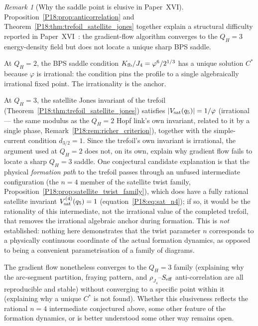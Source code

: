 \documentclass[11pt,a4paper]{article}
\theoremstyle{definition}\newtheorem{definition}[theorem]{Definition}
\theoremstyle{remark}
\newtheorem{remark}[theorem]{Remark}
\newcommand{\vp}{\varphi}
\newcommand{\QH}{Q_H}
\newcommand{\dimq}[1]{d_{#1}}
\newcommand{\Jones}{V}
\begin{document}
\begin{remark}[Why the saddle point is elusive in Paper~XVI]
\label{P18:rem:saddle_difficulty}
Proposition~\ref{P18:prop:anticorrelation} and
Theorem~\ref{P18:thm:trefoil_satellite_jones} together explain a structural
difficulty reported in Paper~XVI~\cite{Paper16}: the gradient-flow
algorithm converges to the $\QH=3$ energy-density field but does
not locate a unique sharp BPS saddle.

At $\QH=2$, the BPS saddle condition $K_{\rm fb}/J_4=\vp^6/2^{1/3}$
has a unique solution $C^*$ because $\vp$ is irrational: the
condition pins the profile to a single algebraically irrational
fixed point.  The irrationality is the anchor.

At $\QH=3$, the satellite Jones invariant of the trefoil
(Theorem~\ref{P18:thm:trefoil_satellite_jones}) satisfies
$|\Jones_{\rm sat}(q_5)|=1/\vp$ (irrational --- the same modulus as
the $\QH=2$ Hopf link's own invariant, related to it by a single
phase, Remark~\ref{P18:rem:richer_criterion}), together with the
simple-current condition $\dimq{3/2}=1$.  Since the trefoil's own
invariant is irrational, the argument used at $\QH=2$ does not, on
its own, explain why gradient flow fails to locate a sharp $\QH=3$
saddle.  One conjectural candidate explanation is that the physical
\emph{formation path} to the trefoil passes through an unfused
intermediate configuration (the $n=4$ member of the satellite twist
family, Proposition~\ref{P18:prop:satellite_twist_family}), which
does have a fully rational satellite invariant
$\Jones_{\rm sat}^{(4)}(q_5)=1$ (equation~\eqref{P18:eq:sat_n4}); if
so, it would be the rationality of this intermediate, not the
irrational value of the completed trefoil, that removes the
irrational algebraic anchor during formation.  This is \emph{not}
established: nothing here demonstrates that the twist parameter $n$
corresponds to a physically continuous coordinate of the actual
formation dynamics, as opposed to being a convenient parametrisation
of a family of diagrams.

The gradient flow nonetheless converges to the $\QH=3$ family
(explaining why the arc-segment partition, fraying pattern, and
$\rho_{J_4}$--$S_{\rm eff}$ anti-correlation are all reproducible
and stable) without converging to a specific point within it
(explaining why a unique $C^*$ is not found).  Whether this
elusiveness reflects the rational $n=4$ intermediate conjectured
above, some other feature of the formation dynamics, or is better
understood some other way remains open.


\end{remark}
\end{document}
